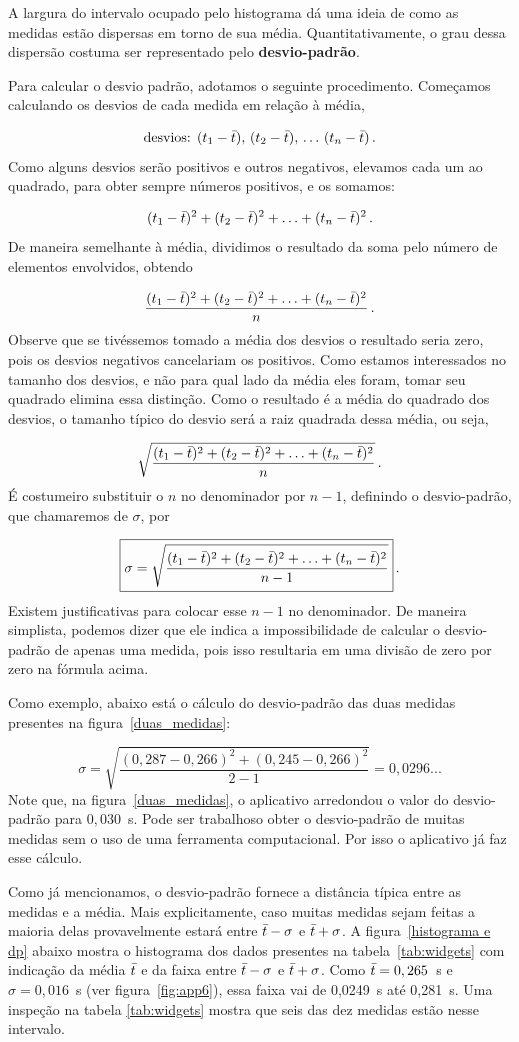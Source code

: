 \documentclass[12pt, a4paper]{article}
\begin{document}
A largura do intervalo ocupado pelo histograma dá uma ideia de como as medidas estão dispersas em torno de sua média. Quantitativamente, o grau dessa dispersão costuma ser representado pelo \textbf{desvio-padrão}.

Para calcular o desvio padrão, adotamos o seguinte procedimento. Começamos calculando os desvios de cada medida em relação à média,

\[\text{desvios: } (t_1-\Bar{t}), \, (t_2-\Bar{t}), \, \dots \, (t_n-\Bar{t})\, .\]
Como alguns desvios serão positivos e outros negativos, elevamos cada um ao quadrado, para obter sempre números positivos, e os somamos:

\[(t_1-\Bar{t})^2 +(t_2-\Bar{t})^2 + \ldots + (t_n-\Bar{t})^2\, .\]
De maneira semelhante à média, dividimos o resultado da soma pelo número de elementos envolvidos, obtendo

\[\frac{(t_1-\Bar{t})^2 +(t_2-\Bar{t})^2 + \ldots + (t_n-\Bar{t})^2}{n}\, .\]
Observe que se tivéssemos tomado a média dos desvios o resultado seria zero, pois os desvios negativos cancelariam os positivos. Como estamos interessados no tamanho dos desvios, e não para qual lado da média eles foram, tomar seu quadrado elimina essa distinção. Como o resultado é a média do quadrado dos desvios, o tamanho típico do desvio será a raiz quadrada dessa média, ou seja,

\[\sqrt{\frac{(t_1-\Bar{t})^2 +(t_2-\Bar{t})^2 + \ldots + (t_n-\Bar{t})^2}{n}}\, .\]
É costumeiro substituir o $n$ no denominador por $n-1$, definindo o desvio-padrão, que chamaremos de $\sigma$, por

\[\boxed{\sigma=\sqrt{\frac{(t_1-\Bar{t})^2 +(t_2-\Bar{t})^2 + \ldots + (t_n-\Bar{t})^2}{n-1}}}\, .\]
Existem justificativas para colocar esse $n-1$ no denominador. De maneira simplista, podemos dizer que ele indica a impossibilidade de calcular o desvio-padrão de apenas uma medida, pois isso resultaria em uma divisão de zero por zero na fórmula acima.

Como exemplo, abaixo está o cálculo do desvio-padrão das duas medidas presentes na figura~\ref{duas_medidas}:

\[\sigma=\sqrt{\frac{(0,287-0,266)^2+(0,245-0,266)^2}{2-1}}=0,0296...\]
Note  que, na figura~\ref{duas_medidas}, o aplicativo arredondou o valor do desvio-padrão para $0,030$~s. Pode ser trabalhoso obter o desvio-padrão de muitas medidas sem o uso de uma ferramenta computacional. Por isso o aplicativo já faz esse cálculo.

Como já mencionamos, o desvio-padrão fornece a distância típica entre as medidas e a média. Mais explicitamente, caso muitas medidas sejam feitas a maioria delas provavelmente estará entre $\Bar{t}-\sigma$ e $\Bar{t}+\sigma$. A figura~\ref{histograma e dp} abaixo mostra o histograma dos dados presentes na tabela~\ref{tab:widgets} com indicação da média $\Bar{t}$ e da faixa entre $\Bar{t}-\sigma$ e $\Bar{t}+\sigma$. Como $\Bar{t}=0,265$~s e $\sigma=0,016$~s (ver figura~\ref{fig:app6}), essa faixa vai de 0,0249~s até 0,281~s. Uma inspeção na tabela \ref{tab:widgets} mostra que seis das dez medidas estão nesse intervalo.
\end{document}
